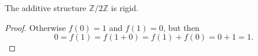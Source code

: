 \begin{theorem}
	\label{thm:rigid}
	The additive structure $\mathbb Z/ 2\mathbb Z$ is rigid.
\end{theorem}
\begin{proof}
	Otherwise $f(0)=1$ and $f(1)=0$, but then
	\[
	0=f(1)=f(1+0)=f(1)+f(0)=0+1=1.
	\]
\end{proof}

\cite{*}

